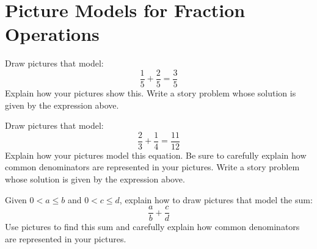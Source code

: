 \newpage
\section{Picture Models for Fraction Operations}\label{A:FO}
\begin{prob} 
Draw pictures that model:
\[
\frac{1}{5} + \frac{2}{5} = \frac{3}{5}
\]
Explain how your pictures show this. Write a story problem whose
solution is given by the expression above.
\end{prob}

\begin{prob} 
Draw pictures that model:
\[
\frac{2}{3} + \frac{1}{4} = \frac{11}{12}
\]
Explain how your pictures model this equation. Be sure to carefully
explain how common denominators are represented in your
pictures. Write a story problem whose solution is given by the
expression above.
\end{prob}

\begin{prob} 
Given $0<a\le b$ and $0<c\le d$, explain how to draw pictures
that model the sum:
\[
\frac{a}{b} + \frac{c}{d}
\]
Use pictures to find this sum and carefully explain how common
denominators are represented in your pictures.
\end{prob}


%
%
%
